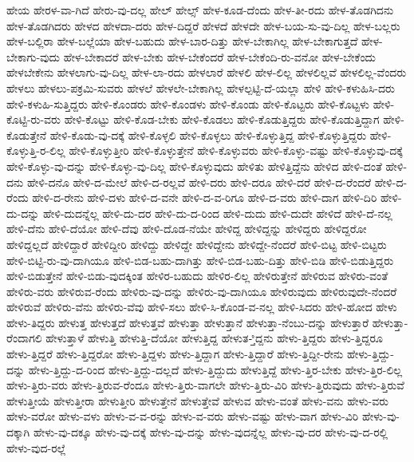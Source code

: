 {ಹೇಯ
ಹೇರಳ-ವಾ-ಗಿದೆ
ಹೇರು-ವು-ದಲ್ಲ
ಹೇಲ್
ಹೇಲ್ಸ್
ಹೇಳ-ಕೂಡ-ದೆಂದು
ಹೇಳ-ತೀ-ರದು
ಹೇಳ-ತೊಡಗಿದನು
ಹೇಳ-ತೊಡಗಿದರು
ಹೇಳದ
ಹೇಳದಾ-ದರು
ಹೇಳ-ದಿದ್ದರೆ
ಹೇಳದೆ
ಹೇಳದೇ
ಹೇಳ-ಬಯ-ಸು-ವು-ದಿಲ್ಲ
ಹೇಳ-ಬಲ್ಲರು
ಹೇಳ-ಬಲ್ಲಿರಾ
ಹೇಳ-ಬಲ್ಲೆಯಾ
ಹೇಳ-ಬಹುದು
ಹೇಳ-ಬಾರ-ದಿತ್ತು
ಹೇಳ-ಬೇಕಾಗಿಲ್ಲ
ಹೇಳ-ಬೇಕಾಗುತ್ತದೆ
ಹೇಳ-ಬೇಕಾಗು-ವುದು
ಹೇಳ-ಬೇಕಾದರೆ
ಹೇಳ-ಬೇಕು
ಹೇಳ-ಬೇಕೆಂದರೆ
ಹೇಳ-ಬೇಕೆಂದಿ-ರು-ವನೋ
ಹೇಳ-ಬೇಕೆಂದು
ಹೇಳಬೇಕೇನು
ಹೇಳಲಾಗು-ವು-ದಿಲ್ಲ
ಹೇಳ-ಲಾ-ರದು
ಹೇಳಲಾರೆ
ಹೇಳಲಿ
ಹೇಳ-ಲಿಲ್ಲ
ಹೇಳಲಿಲ್ಲವೆ
ಹೇಳಲಿಲ್ಲ-ವೆಂದರು
ಹೇಳಲು
ಹೇಳಲು-ಪಕ್ರಮಿ-ಸುವರು
ಹೇಳಲೆ
ಹೇಳಲೇ-ಬೇಕಾಗಿಲ್ಲ
ಹೇಳಲ್ಪಟ್ಟಿ-ದೆ-ಯಲ್ಲಾ
ಹೇಳಿ
ಹೇಳಿ-ಕಳುಹಿಸಿ-ದರು
ಹೇಳಿ-ಕಳುಹಿ-ಸುತ್ತಿದ್ದರು
ಹೇಳಿ-ಕೊಂಡರು
ಹೇಳಿ-ಕೊಂಡಳು
ಹೇಳಿ-ಕೊಂಡು
ಹೇಳಿ-ಕೊಟ್ಟರು
ಹೇಳಿ-ಕೊಟ್ಟಳು
ಹೇಳಿ-ಕೊಟ್ಟಿ-ರು-ವರು
ಹೇಳಿ-ಕೊಟ್ಟು
ಹೇಳಿ-ಕೊಡ-ಬೇಕು
ಹೇಳಿ-ಕೊಡಲು
ಹೇಳಿ-ಕೊಡುತ್ತಿದ್ದರು
ಹೇಳಿ-ಕೊಡುತ್ತಿದ್ದಾಗ
ಹೇಳಿ-ಕೊಡುತ್ತೇನೆ
ಹೇಳಿ-ಕೊಡು-ವು-ದಕ್ಕೆ
ಹೇಳಿ-ಕೊಳ್ಳಲಿ
ಹೇಳಿ-ಕೊಳ್ಳಲು
ಹೇಳಿ-ಕೊಳ್ಳುತ್ತಿದ್ದ
ಹೇಳಿ-ಕೊಳ್ಳುತ್ತಿದ್ದರು
ಹೇಳಿ-ಕೊಳ್ಳುತ್ತಿ-ರ-ಲಿಲ್ಲ
ಹೇಳಿ-ಕೊಳ್ಳುತ್ತೀರಿ
ಹೇಳಿ-ಕೊಳ್ಳುತ್ತೇನೆ
ಹೇಳಿ-ಕೊಳ್ಳುವರು
ಹೇಳಿ-ಕೊಳ್ಳು-ವಷ್ಟು
ಹೇಳಿ-ಕೊಳ್ಳುವು-ದಕ್ಕೆ
ಹೇಳಿ-ಕೊಳ್ಳು-ವು-ದನ್ನು
ಹೇಳಿ-ಕೊಳ್ಳು-ವು-ದಿಲ್ಲ
ಹೇಳಿ-ಕೊಳ್ಳುವುದು
ಹೇಳಿತು
ಹೇಳಿತ್ತಿದ್ದೆನು
ಹೇಳಿದ
ಹೇಳಿ-ದಂತೆ
ಹೇಳಿ-ದನು
ಹೇಳಿ-ದನೊ
ಹೇಳಿ-ದ-ಮೇಲೆ
ಹೇಳಿ-ದ-ರಲ್ಲವೆ
ಹೇಳಿ-ದರು
ಹೇಳಿ-ದರೂ
ಹೇಳಿ-ದರೆ
ಹೇಳಿ-ದ-ರೆಂದರೆ
ಹೇಳಿ-ದ-ರೆಂದು
ಹೇಳಿ-ದ-ರೇನು
ಹೇಳಿ-ದಳು
ಹೇಳಿ-ದ-ವನೇ
ಹೇಳಿ-ದ-ವ-ರಿಗೂ
ಹೇಳಿ-ದ-ವರು
ಹೇಳಿ-ದಾಗ
ಹೇಳಿ-ದಿರಿ
ಹೇಳಿ-ದು-ದನ್ನು
ಹೇಳಿ-ದುದನ್ನೆಲ್ಲ
ಹೇಳಿ-ದು-ದರ
ಹೇಳಿ-ದು-ದ-ರಿಂದ
ಹೇಳಿ-ದುದು
ಹೇಳಿ-ದುದೇ
ಹೇಳಿದೆ
ಹೇಳಿ-ದೆ-ನಲ್ಲ
ಹೇಳಿ-ದೆನು
ಹೇಳಿ-ದೆಯೋ
ಹೇಳಿ-ದೆವು
ಹೇಳಿ-ದೊಡ-ನೆಯೇ
ಹೇಳಿದ್ದ
ಹೇಳಿದ್ದನ್ನು
ಹೇಳಿದ್ದರು
ಹೇಳಿದ್ದರೋ
ಹೇಳಿದ್ದಲ್ಲದೆ
ಹೇಳಿದ್ದಾರೆ
ಹೇಳಿದ್ದೀರಿ
ಹೇಳಿದ್ದು
ಹೇಳಿದ್ದೇ
ಹೇಳಿದ್ದೇನು
ಹೇಳಿದ್ದೇ-ನೆಂದರೆ
ಹೇಳಿ-ಬಿಟ್ಟ
ಹೇಳಿ-ಬಿಟ್ಟರು
ಹೇಳಿ-ಬಿಟ್ಟಿ-ರು-ವು-ದಾಗಿಯೂ
ಹೇಳಿ-ಬಿಡ-ಬಹು-ದಾಗಿತ್ತು
ಹೇಳಿ-ಬಿಡ-ಬಹು-ದಿತ್ತು
ಹೇಳಿ-ಬಿಡಿ
ಹೇಳಿ-ಬಿಡುತ್ತಿದ್ದರು
ಹೇಳಿ-ಬಿಡುತ್ತೇನೆ
ಹೇಳಿ-ಬಿಡು-ವುದಕ್ಕಿಂತ
ಹೇಳಿರ-ಬಹುದು
ಹೇಳಿರ-ಲಿಲ್ಲ
ಹೇಳಿರುತ್ತೇನೆ
ಹೇಳಿರುವ
ಹೇಳಿರು-ವಂತೆ
ಹೇಳಿರು-ವರು
ಹೇಳಿರುವ-ರೆಂದು
ಹೇಳಿರು-ವು-ದನ್ನು
ಹೇಳಿರು-ವು-ದಾಗಿಯೂ
ಹೇಳಿರುವುದು
ಹೇಳಿರುವುದೇ-ನೆಂದರೆ
ಹೇಳಿರುವೆ
ಹೇಳಿರು-ವೆನು
ಹೇಳಿರು-ವೆವು
ಹೇಳಿ-ಸಲು
ಹೇಳಿ-ಸಿ-ಕೊಂಡ-ವ-ನಲ್ಲ
ಹೇಳಿ-ಸಿದರು
ಹೇಳಿ-ಹೋದ
ಹೇಳು
ಹೇಳು-ತಿದ್ದರು
ಹೇಳುತ್ತ
ಹೇಳುತ್ತದೆ
ಹೇಳುತ್ತವೆ
ಹೇಳುತ್ತಾ
ಹೇಳುತ್ತಾನೆ
ಹೇಳುತ್ತಾ-ನೆಂಬು-ದನ್ನು
ಹೇಳುತ್ತಾರೆ
ಹೇಳುತ್ತಾ-ರೆಂದಾಗಲಿ
ಹೇಳುತ್ತಾಳೆ
ಹೇಳುತ್ತಿ
ಹೇಳುತ್ತಿ-ದೆಯೋ
ಹೇಳುತ್ತಿದ್ದ
ಹೇಳುತ-್ತಿದ್ದನು
ಹೇಳು-ತ್ತಿದ್ದರು
ಹೇಳು-ತ್ತಿದ್ದರೂ
ಹೇಳು-ತ್ತಿದ್ದರೆ
ಹೇಳು-ತ್ತಿದ್ದರೋ
ಹೇಳು-ತ್ತಿದ್ದಳು
ಹೇಳು-ತ್ತಿದ್ದಾಗ
ಹೇಳು-ತ್ತಿದ್ದಾರೆ
ಹೇಳು-ತ್ತಿದ್ದೀ-ರೇನು
ಹೇಳು-ತ್ತಿದ್ದು-ದನ್ನು
ಹೇಳು-ತ್ತಿದ್ದು-ದ-ರಿಂದ
ಹೇಳು-ತ್ತಿದ್ದು-ದಲ್ಲದೆ
ಹೇಳು-ತ್ತಿದ್ದುದು
ಹೇಳುತ್ತಿದ್ದೆ
ಹೇಳು-ತ್ತಿರ-ಬೇಕು
ಹೇಳು-ತ್ತಿರ-ಲಿಲ್ಲ
ಹೇಳು-ತ್ತಿರು-ವರು
ಹೇಳು-ತ್ತಿರುವ-ರೆಂದೂ
ಹೇಳು-ತ್ತಿರು-ವಾಗಲೇ
ಹೇಳು-ತ್ತಿರು-ವಿರಿ
ಹೇಳು-ತ್ತಿರುವುದು
ಹೇಳು-ತ್ತಿರುವೆ
ಹೇಳುತ್ತೀಯೆ
ಹೇಳುತ್ತೀರಾ
ಹೇಳುತ್ತೀರಿ
ಹೇಳುತ್ತೇನೆ
ಹೇಳುತ್ತೇವೆ
ಹೇಳುವ
ಹೇಳು-ವಂತೆ
ಹೇಳು-ವನು
ಹೇಳು-ವರು
ಹೇಳು-ವರೋ
ಹೇಳು-ವಳು
ಹೇಳು-ವ-ವ-ರನ್ನು
ಹೇಳು-ವ-ವರು
ಹೇಳು-ವಷ್ಟು
ಹೇಳು-ವಾಗ
ಹೇಳು-ವಿರಿ
ಹೇಳು-ವು-ದಕ್ಕಾಗಿ
ಹೇಳು-ವು-ದಕ್ಕೂ
ಹೇಳು-ವು-ದಕ್ಕೆ
ಹೇಳು-ವು-ದನ್ನು
ಹೇಳು-ವುದನ್ನೆಲ್ಲ
ಹೇಳು-ವು-ದರ
ಹೇಳು-ವು-ದ-ರಲ್ಲಿ
ಹೇಳು-ವುದ-ರಲ್ಲೆ
}
